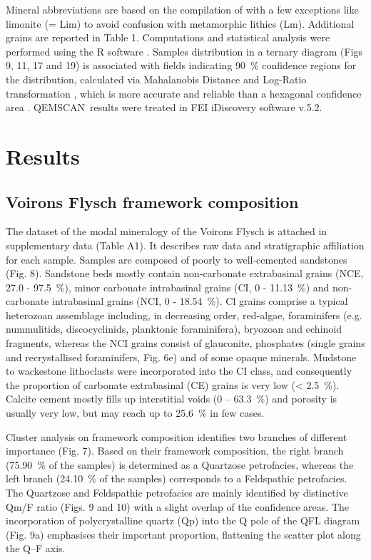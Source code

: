 \documentclass[twoside]{article}
\newcommand\registred{\textsuperscript{\tiny\textregistered}}
\begin{document}
Mineral abbreviations are based on the compilation of \cite{Whitney2010} with a few exceptions like limonite (= Lim) to avoid confusion with metamorphic lithics (Lm). Additional grains are reported in Table 1. Computations and statistical analysis were performed using the R software \citep{RCoreTeam2015}. Samples distribution in a ternary diagram (Figs 9, 11, 17 and 19) is associated with fields indicating 90~\% confidence regions for the distribution, calculated via Mahalanobis Distance and Log-Ratio transformation \citep{Hamilton2016}, which is more accurate and reliable \citep{Weltje2002} than a hexagonal confidence area \citep{Ingersoll1978}. QEMSCAN\registred\ results were treated in FEI iDiscovery software v.5.2.

\section{Results}

\subsection{Voirons Flysch framework composition}

The dataset of the modal mineralogy of the Voirons Flysch is attached in supplementary data (Table A1). It describes raw data and stratigraphic affiliation for each sample. Samples are composed of poorly to well-cemented sandstones (Fig. 8). Sandstone beds mostly contain non-carbonate extrabasinal grains (NCE, 27.0 - 97.5~\%), minor carbonate intrabasinal grains (CI, 0 - 11.13~\%) and non-carbonate intrabasinal grains (NCI, 0 - 18.54~\%). Cl grains comprise a typical heterozoan assemblage including, in decreasing order, red-algae, foraminifers (e.g. nummulitids, discocyclinids, planktonic foraminifera), bryozoan and echinoid fragments, whereas the NCI grains consist of glauconite, phosphates (single grains and recrystallised foraminifers, Fig. 6e) and of some opaque minerals. Mudstone to wackestone lithoclasts were incorporated into the CI class, and consequently the proportion of carbonate extrabasinal (CE) grains is very low (< 2.5~\%). Calcite cement mostly fills up interstitial voids (0 – 63.3~\%) and porosity is usually very low, but may reach up to 25.6~\% in few cases.\par
\medskip
Cluster analysis on framework composition identifies two branches of different importance (Fig. 7). Based on their framework composition, the right branch (75.90~\% of the samples) is determined as a Quartzose petrofacies, whereas the left branch (24.10~\% of the samples) corresponds to a Feldspathic petrofacies. The Quartzose and Feldspathic petrofacies are mainly identified by distinctive Qm/F ratio (Figs. 9 and 10) with a slight overlap of the confidence areas. The incorporation of polycrystalline quartz (Qp) into the Q pole of the QFL diagram (Fig. 9a) emphasises their important proportion, flattening the scatter plot along the Q–F axis.
\end{document}
